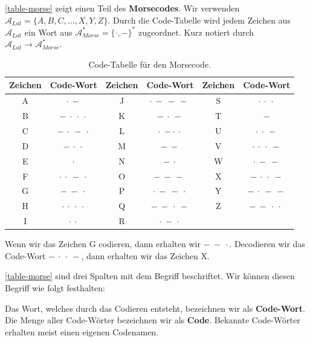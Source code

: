 \begin{example}[Morsecode]
\autoref{table-morse} zeigt einen Teil des \textbf{Morsecodes}. Wir verwenden $\mathscr{A}_{Lat} = \{A, B, C, \dots , X, Y, Z\}$. Durch die Code-Tabelle wird jedem Zeichen aus $\mathscr{A}_{Lat}$ ein Wort aus $\mathscr{A}_{Morse}^*= \{\cdot, -\}^*$ zugeordnet. Kurz notiert durch $\mathscr{A}_{Lat} \rightarrow \mathscr{A}_{Morse}^*$. 

\begin{table}[htb]
\centering
\begin{tabular}{|c|c||c|c||c|c|}
\hline
\textbf{Zeichen} & \textbf{Code-Wort} & \textbf{Zeichen} & \textbf{Code-Wort} & \textbf{Zeichen} & \textbf{Code-Wort} \\ \hline
A & $\cdot~-$ & J & $\cdot~-~-~-~$ & S & $\cdot~\cdot~\cdot$ \\ \hline
B & $-~\cdot~\cdot~\cdot$ & K & $-~\cdot~-$ & T & $-$ \\ \hline
C & $-~\cdot~-~\cdot$ & L & $\cdot~-\cdot~\cdot$ & U & $\cdot~\cdot~-$ \\ \hline
D &  $-~\cdot~\cdot$  & M & $-~-$ & V & $\cdot~\cdot~\cdot~-$ \\ \hline
E & $\cdot$ & N & $-~\cdot$ & W & $\cdot~-~-$ \\ \hline
F & $\cdot~\cdot~-~\cdot$ & O & $-~-~-~$ & X & $-~\cdot~\cdot~-$ \\ \hline
G & $-~-~\cdot$ & P & $\cdot~-~-~\cdot$  & Y & $-~\cdot~-~-$ \\ \hline
H & $\cdot~\cdot~\cdot~\cdot$ & Q & $-~-~\cdot~-$ & Z & $-~-~\cdot~\cdot~$ \\ \hline
I & $\cdot~\cdot$ & R & $\cdot~-~\cdot$ &   &  \\ \hline
\end{tabular}
\caption{Code-Tabelle für den Morsecode.}
\label{table-morse}
\end{table}

Wenn wir das Zeichen G codieren, dann erhalten wir $-~-~\cdot$. Decodieren wir das Code-Wort $-~\cdot~\cdot~-$, dann erhalten wir das Zeichen X.

\end{example}

\autoref{table-morse} sind drei Spalten mit dem Begriff  beschriftet. Wir können diesen Begriff wie folgt festhalten:

\begin{definition}
Das Wort, welches durch das Codieren entsteht, bezeichnen wir als \textbf{Code-Wort}. Die Menge aller Code-Wörter bezeichnen wir als \textbf{Code}. Bekannte Code-Wörter erhalten meist einen eigenen Codenamen.
\end{definition}

